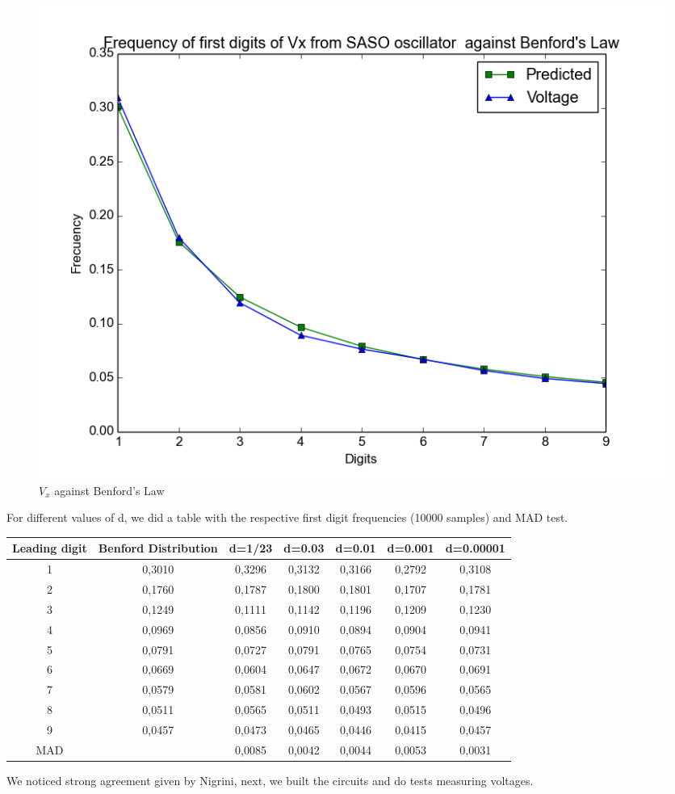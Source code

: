 \begin{itemize}
            \begin{figure}[H]
            \centering
            \includegraphics[scale=0.4]{imagenes/2-benford/Sh_vy.png}
            \caption{$V_x$ against Benford's Law}
            \end{figure}
For different values of d, we did a table with the respective first digit frequencies (10000 samples)  and MAD test.

\begin{center}
  \begin{tabular}{ c | c | c | c | c | c | c }
    \hline
    Leading digit  & Benford Distribution & d=1/23 &d=0.03 &d=0.01& d=0.001 &d=0.00001 \\ \hline
1&		0,3010&	0,3296&	0,3132&	0,3166&	0,2792&	0,3108\\ \hline
2&		0,1760&	0,1787&	0,1800&	0,1801&	0,1707&	0,1781\\ \hline
3&		0,1249&	0,1111&	0,1142&	0,1196&	0,1209&	0,1230\\ \hline
4&		0,0969&	0,0856&	0,0910&	0,0894&	0,0904&	0,0941\\ \hline
5&		0,0791&	0,0727&	0,0791&	0,0765&	0,0754&	0,0731\\ \hline
6&		0,0669&	0,0604&	0,0647&	0,0672&	0,0670&	0,0691\\ \hline
7&		0,0579&	0,0581&	0,0602&	0,0567&	0,0596&	0,0565\\ \hline
8&		0,0511&	0,0565&	0,0511&	0,0493&	0,0515&	0,0496\\ \hline
9&		0,0457&	0,0473&	0,0465&	0,0446&	0,0415&	0,0457\\ \hline
MAD&  & 0,0085&	0,0042&	0,0044&	0,0053&	0,0031\\ \hline

  \end{tabular}
\end{center}
We noticed strong agreement given by Nigrini\cite{Nigrini97}, next, we built the circuits and do tests measuring voltages.

 \end{itemize}
